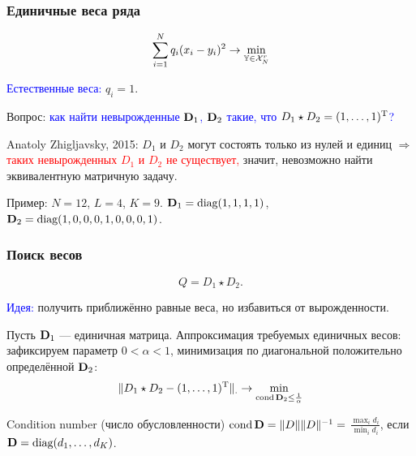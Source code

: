 \documentclass[unicode, notheorems]{beamer}
\DeclareMathOperator{\cond}{cond}
\begin{document}
\begin{frame}
	\frametitle{Единичные веса ряда}
	\vspace{-0.3cm}
	\begin{equation*}
	\sum \limits_{i=1}^N q_i(x_i - y_i)^2 \to \min_{\mathbb{Y} \in \mathcal{X}_N^r}
	\end{equation*}
	
    \textcolor{blue}{Естественные веса:} $q_i = 1$.
	
	\vspace{0.3cm}
	
	Вопрос: \textcolor{blue}{как найти невырожденные $\mathbf{D}_1$, $\mathbf{D}_2$ такие, что $D_1 \star D_2 = (1, \ldots, 1)^{\mathrm{T}}$?}
	
	Anatoly Zhigljavsky, 2015: $D_1$ и $D_2$ могут состоять только из нулей и единиц $\Rightarrow$ \textcolor{red}{таких невырожденных $D_1$ и $D_2$ не существует,} значит, невозможно найти эквивалентную матричную задачу.
	
	\vspace{0.4cm}
	Пример: $N = 12$, $L = 4$, $K = 9$. $\mathbf{D}_1 = \text{diag}(1, 1, 1, 1)$, 
	$\mathbf{D}_2 = \text{diag}(1, 0, 0, 0, 1, 0, 0, 0, 1)$.
\end{frame}

\begin{frame}
	\frametitle{Поиск весов}
	\begin{equation*}
	Q = D_1 \star D_2.
	\end{equation*}
	
	\textcolor{blue}{Идея:} получить приближённо равные веса, но избавиться от вырожденности. 
	
	Пусть $\mathbf{D}_1$ --- единичная матрица. Аппроксимация требуемых единичных весов: зафиксируем параметр $0 < \alpha < 1$, минимизация по диагональной положительно определённой $\mathbf{D}_2$:
	\begin{equation*}
	\|D_1 \star D_2 - (1, \ldots, 1)^\rmT\|_. \to \min_{\cond \bfD_2 \le \frac{1}{\alpha}}
	\end{equation*}
	
	\vspace{0.2cm}
	Condition number (число обусловленности) $\cond \bfD = \|D\| \|D\|^{-1} = $ $\frac{\max_i d_i}{\min_i d_i}$, если $\mathbf{D} = \text{diag}(d_1, \ldots, d_K)$.
\end{frame}
\end{document}
